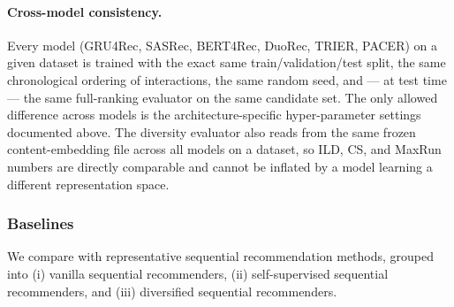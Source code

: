 \paragraph{Cross-model consistency.}
Every model (GRU4Rec, SASRec, BERT4Rec, DuoRec, TRIER, PACER) on a given dataset is trained with the exact same train/validation/test split, the same chronological ordering of interactions, the same random seed, and — at test time — the same full-ranking evaluator on the same candidate set. The only allowed difference across models is the architecture-specific hyper-parameter settings documented above. The diversity evaluator also reads from the same frozen content-embedding file across all models on a dataset, so ILD, CS, and MaxRun numbers are directly comparable and cannot be inflated by a model learning a different representation space.

\subsubsection{Baselines}
We compare with representative sequential recommendation methods, grouped into (i) vanilla sequential recommenders, (ii) self-supervised sequential recommenders, and (iii) diversified sequential recommenders.

